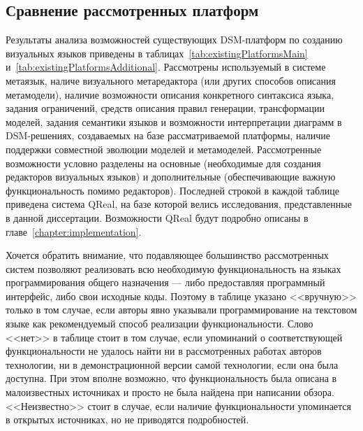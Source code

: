 \subsection{Сравнение рассмотренных платформ}
Результаты анализа возможностей существующих \ac{DSM}-платформ по созданию визуальных 
языков приведены в таблицах~\ref{tab:existingPlatformsMain} и~\ref{tab:existingPlatformsAdditional}.
Рассмотрены используемый в системе метаязык, наличе визуального метаредактора (или других способов описания метамодели),
наличие возможности описания конкретного синтаксиса языка, задания ограничений, средств описания
правил генерации, трансформации моделей, задания семантики языков и возможности интерпретации
диаграмм в \ac{DSM}-решениях, создаваемых на базе рассматриваемой платформы, наличие поддержки совместной
эволюции моделей и метамоделей. Рассмотренные возможности условно разделены на основные 
(необходимые для создания редакторов визуальных языков) и дополнительные (обеспечивающие
важную функциональность помимо редакторов). Последней строкой в каждой таблице приведена 
система QReal, на базе которой велись исследования, представленные в данной диссертации.
Возможности QReal будут подробно описаны в главе~\ref{chapter:implementation}.

Хочется обратить внимание, что подавляющее большинство рассмотренных систем позволяют реализовать
всю необходимую функциональность на языках программирования общего назначения --- либо 
предоставляя программный интерфейс, либо свои исходные коды. Поэтому в таблице указано
<<вручную>> только в том случае, если авторы явно указывали программирование на текстовом языке
как рекомендуемый способ реализации функциональности. Слово <<нет>> в таблице стоит в том
случае, если упоминаний о соответствующей функциональности не удалось найти ни в рассмотренных 
работах авторов технологии, ни в демонстрационной версии самой технологии, если она была доступна.
При этом вполне возможно, что функциональность была описана в малоизвестных источниках и просто
не была найдена при написании обзора. <<Неизвестно>> стоит в случае, если наличие функциональности
упоминается в открытых источниках, но не приводятся подробностей.


